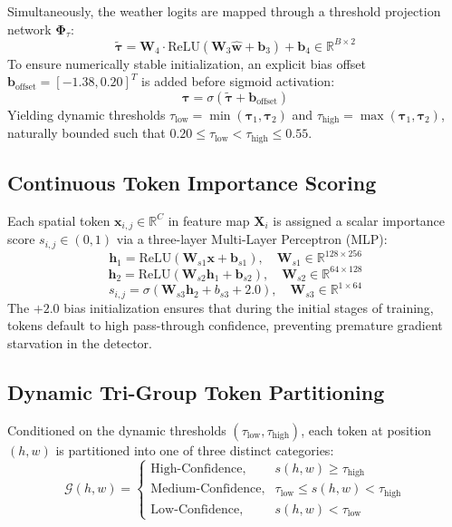 \documentclass[conference]{IEEEtran}
\begin{document}
Simultaneously, the weather logits are mapped through a threshold projection network $\mathbf{\Phi}_{\tau}$:
\begin{equation}
\tilde{\boldsymbol{\tau}} = \mathbf{W}_4 \cdot \text{ReLU}(\mathbf{W}_3 \hat{\mathbf{w}} + \mathbf{b}_3) + \mathbf{b}_4 \in \mathbb{R}^{B \times 2}
\end{equation}
To ensure numerically stable initialization, an explicit bias offset $\mathbf{b}_{\text{offset}} = [-1.38, 0.20]^T$ is added before sigmoid activation:
\begin{equation}
\boldsymbol{\tau} = \sigma(\tilde{\boldsymbol{\tau}} + \mathbf{b}_{\text{offset}})
\end{equation}
Yielding dynamic thresholds $\tau_{\text{low}} = \min(\boldsymbol{\tau}_1, \boldsymbol{\tau}_2)$ and $\tau_{\text{high}} = \max(\boldsymbol{\tau}_1, \boldsymbol{\tau}_2)$, naturally bounded such that $0.20 \le \tau_{\text{low}} < \tau_{\text{high}} \le 0.55$.

\subsection{Continuous Token Importance Scoring}
Each spatial token $\mathbf{x}_{i, j} \in \mathbb{R}^C$ in feature map $\mathbf{X}_i$ is assigned a scalar importance score $s_{i, j} \in (0, 1)$ via a three-layer Multi-Layer Perceptron (MLP):
\begin{equation}
\mathbf{h}_1 = \text{ReLU}(\mathbf{W}_{s1} \mathbf{x} + \mathbf{b}_{s1}), \quad \mathbf{W}_{s1} \in \mathbb{R}^{128 \times 256}
\end{equation}
\begin{equation}
\mathbf{h}_2 = \text{ReLU}(\mathbf{W}_{s2} \mathbf{h}_1 + \mathbf{b}_{s2}), \quad \mathbf{W}_{s2} \in \mathbb{R}^{64 \times 128}
\end{equation}
\begin{equation}
s_{i, j} = \sigma(\mathbf{W}_{s3} \mathbf{h}_2 + b_{s3} + 2.0), \quad \mathbf{W}_{s3} \in \mathbb{R}^{1 \times 64}
\end{equation}
The $+2.0$ bias initialization ensures that during the initial stages of training, tokens default to high pass-through confidence, preventing premature gradient starvation in the detector.

\subsection{Dynamic Tri-Group Token Partitioning}
Conditioned on the dynamic thresholds $(\tau_{\text{low}}, \tau_{\text{high}})$, each token at position $(h, w)$ is partitioned into one of three distinct categories:
\begin{equation}
\mathcal{G}(h, w) = \begin{cases}
\text{High-Confidence}, & s(h, w) \ge \tau_{\text{high}} \\
\text{Medium-Confidence}, & \tau_{\text{low}} \le s(h, w) < \tau_{\text{high}} \\
\text{Low-Confidence}, & s(h, w) < \tau_{\text{low}}
\end{cases}
\end{equation}
\end{document}
